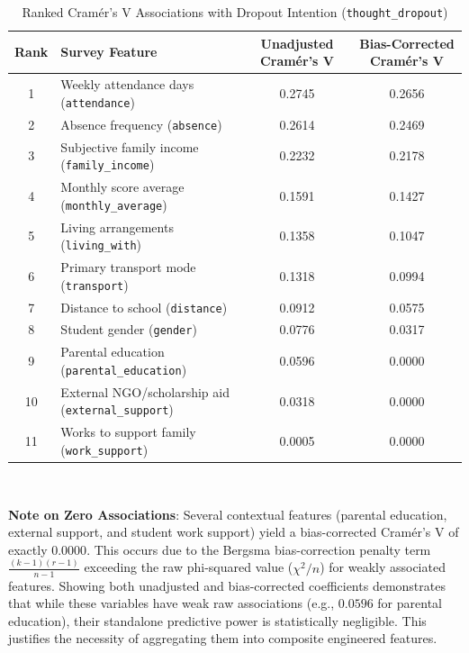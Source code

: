 \begin{table}[htbp]
    \centering
    \caption{Ranked Cram\'{e}r's V Associations with Dropout Intention (\texttt{thought\_dropout})}
    \label{tab:cramers_v_coefficients}
    \begin{tabular}{clcc}
        \toprule
        \textbf{Rank} & \textbf{Survey Feature} & \textbf{Unadjusted Cram\'{e}r's V} & \textbf{Bias-Corrected Cram\'{e}r's V} \\
        \midrule
        1  & Weekly attendance days (\texttt{attendance})        & 0.2745 & 0.2656 \\
        2  & Absence frequency (\texttt{absence})                & 0.2614 & 0.2469 \\
        3  & Subjective family income (\texttt{family\_income})  & 0.2232 & 0.2178 \\
        4  & Monthly score average (\texttt{monthly\_average})   & 0.1591 & 0.1427 \\
        5  & Living arrangements (\texttt{living\_with})         & 0.1358 & 0.1047 \\
        6  & Primary transport mode (\texttt{transport})         & 0.1318 & 0.0994 \\
        7  & Distance to school (\texttt{distance})              & 0.0912 & 0.0575 \\
        8  & Student gender (\texttt{gender})                    & 0.0776 & 0.0317 \\
        9  & Parental education (\texttt{parental\_education})   & 0.0596 & 0.0000 \\
        10 & External NGO/scholarship aid (\texttt{external\_support}) & 0.0318 & 0.0000 \\
        11 & Works to support family (\texttt{work\_support})    & 0.0005 & 0.0000 \\
        \bottomrule
    \end{tabular}
\\ \medskip
\raggedright \footnotesize \textbf{Note on Zero Associations}: Several contextual features (parental education, external support, and student work support) yield a bias-corrected Cram\'{e}r's V of exactly $0.0000$. This occurs due to the Bergsma bias-correction penalty term $\frac{(k-1)(r-1)}{n-1}$ exceeding the raw phi-squared value ($\chi^2/n$) for weakly associated features. Showing both unadjusted and bias-corrected coefficients demonstrates that while these variables have weak raw associations (e.g., $0.0596$ for parental education), their standalone predictive power is statistically negligible. This justifies the necessity of aggregating them into composite engineered features.
\end{table}

